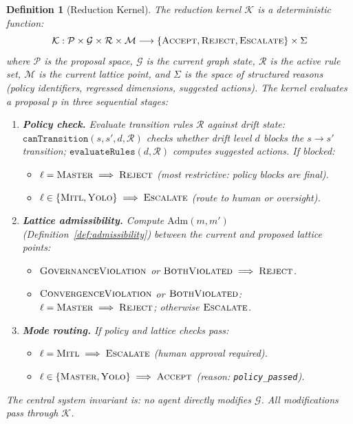 \documentclass[11pt]{article}
\newtheorem{definition}{Definition}
\begin{document}
\begin{definition}[Reduction Kernel]
\label{def:kernel}
The \emph{reduction kernel} $\mathcal{K}$ is a deterministic function:
\[
\mathcal{K} : \mathcal{P} \times \mathcal{G} \times \mathcal{R} \times \mathcal{M} \longrightarrow \{\textsc{Accept}, \textsc{Reject}, \textsc{Escalate}\} \times \Sigma
\]
where $\mathcal{P}$ is the proposal space, $\mathcal{G}$ is the current graph state, $\mathcal{R}$ is the active rule set, $\mathcal{M}$ is the current lattice point, and $\Sigma$ is the space of structured reasons (policy identifiers, regressed dimensions, suggested actions). The kernel evaluates a proposal $p$ in three sequential stages:

\begin{enumerate}
  \item \textbf{Policy check.} Evaluate transition rules $\mathcal{R}$ against drift state: $\texttt{canTransition}(s, s', d, \mathcal{R})$ checks whether drift level $d$ blocks the $s \to s'$ transition; $\texttt{evaluateRules}(d, \mathcal{R})$ computes suggested actions. If blocked:
  \begin{itemize}
    \item $\ell = \textsc{Master} \implies \textsc{Reject}$ (most restrictive: policy blocks are final).
    \item $\ell \in \{\textsc{Mitl}, \textsc{Yolo}\} \implies \textsc{Escalate}$ (route to human or oversight).
  \end{itemize}

  \item \textbf{Lattice admissibility.} Compute $\mathrm{Adm}(m, m')$ (Definition~\ref{def:admissibility}) between the current and proposed lattice points:
  \begin{itemize}
    \item $\textsc{GovernanceViolation}$ or $\textsc{BothViolated} \implies \textsc{Reject}$.
    \item $\textsc{ConvergenceViolation}$ or $\textsc{BothViolated}$: $\ell = \textsc{Master} \implies \textsc{Reject}$; otherwise $\textsc{Escalate}$.
  \end{itemize}

  \item \textbf{Mode routing.} If policy and lattice checks pass:
  \begin{itemize}
    \item $\ell = \textsc{Mitl} \implies \textsc{Escalate}$ (human approval required).
    \item $\ell \in \{\textsc{Master}, \textsc{Yolo}\} \implies \textsc{Accept}$ (reason: \texttt{policy\_passed}).
  \end{itemize}
\end{enumerate}

The central system invariant is: \emph{no agent directly modifies $\mathcal{G}$}. All modifications pass through $\mathcal{K}$.
\end{definition}
\end{document}
